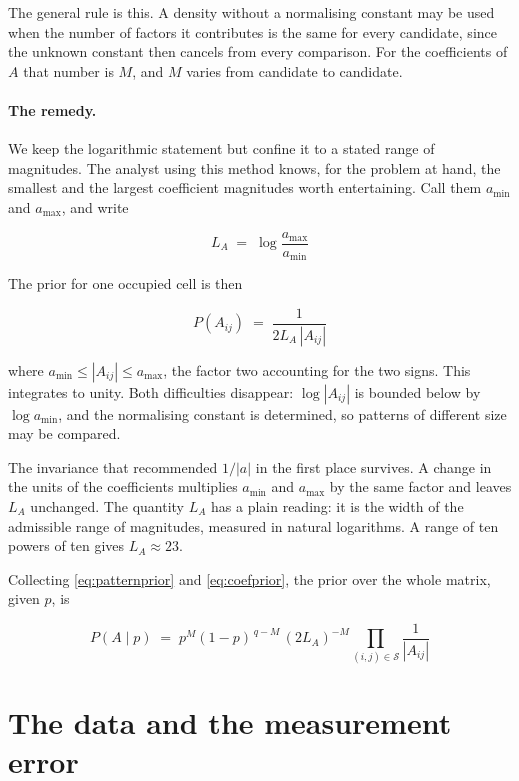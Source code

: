 The general rule is this. A density without a normalising constant may be used when
the number of factors it contributes is the same for every candidate, since the
unknown constant then cancels from every comparison. For the coefficients of $A$ that
number is $M$, and $M$ varies from candidate to candidate.

\paragraph{The remedy.}
We keep the logarithmic statement but confine it to a stated range of magnitudes.
The analyst using this method knows, for the problem at hand, the smallest and the
largest coefficient magnitudes worth entertaining. Call them $a_{\min}$ and
$a_{\max}$, and write

\begin{equation}
L_{A} \;=\; \log \frac{a_{\max}}{a_{\min}}
\label{eq:LA}
\end{equation}

The prior for one occupied cell is then

\begin{equation}
P(A_{ij}) \;=\; \frac{1}{2 L_{A} \, |A_{ij}|}
\label{eq:coefprior}
\end{equation}

where $a_{\min} \le |A_{ij}| \le a_{\max}$, the factor two accounting for the two
signs. This integrates to unity. Both
difficulties disappear: $\log|A_{ij}|$ is bounded below by $\log a_{\min}$, and the
normalising constant is determined, so patterns of different size may be compared.

The invariance that recommended $1/|a|$ in the first place survives. A change in the
units of the coefficients multiplies $a_{\min}$ and $a_{\max}$ by the same factor and
leaves $L_{A}$ unchanged. The quantity $L_{A}$ has a plain reading: it is the width of
the admissible range of magnitudes, measured in natural logarithms. A range of ten
powers of ten gives $L_{A} \approx 23$.

Collecting \eqref{eq:patternprior} and \eqref{eq:coefprior}, the prior over the whole
matrix, given $p$, is

\begin{equation}
P(A \mid p) \;=\; p^{M} (1-p)^{\,q-M} \, (2 L_{A})^{-M}
\prod_{(i,j) \in \mathcal{S}} \frac{1}{|A_{ij}|}
\label{eq:Aprior}
\end{equation}

\section{The data and the measurement error}
\label{sec:noise}

